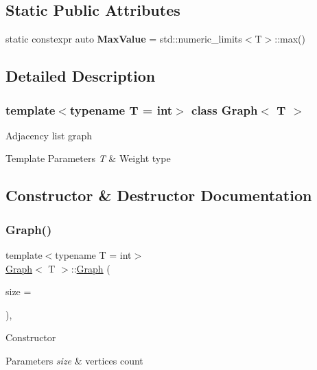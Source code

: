 \subsection*{Static Public Attributes}
\begin{DoxyCompactItemize}
\item 
\mbox{\label{class_graph_a9ee049f1aa0ee96183f8cc0b96371352}} 
static constexpr auto {\bfseries Max\+Value} = std\+::numeric\+\_\+limits$<$T$>$\+::max()
\end{DoxyCompactItemize}


\subsection{Detailed Description}
\subsubsection*{template$<$typename T = int$>$\newline
class Graph$<$ T $>$}

Adjacency list graph 
\begin{DoxyTemplParams}{Template Parameters}
{\em T} & Weight type \\
\hline
\end{DoxyTemplParams}


\subsection{Constructor \& Destructor Documentation}
\mbox{\label{class_graph_ae4d33378f071400af20f374d03a2ae17}} 
\subsubsection{\texorpdfstring{Graph()}{Graph()}}
{\footnotesize\ttfamily template$<$typename T = int$>$ \\
\hyperlink{class_graph}{Graph}$<$ T $>$\+::\hyperlink{class_graph}{Graph} (\begin{DoxyParamCaption}\item[{size\+\_\+t}]{size = {} }\end{DoxyParamCaption})\hspace{0.3cm}{\ttfamily [inline]}, {\ttfamily [explicit]}}

Constructor 
\begin{DoxyParams}{Parameters}
{\em size} & vertices count \\
\hline
\end{DoxyParams}


